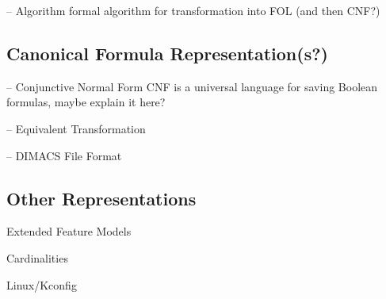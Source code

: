 \begin{frame}{-- Algorithm}
	formal algorithm for transformation into FOL (and then CNF?)
\end{frame}

\subsection{Canonical Formula Representation(s?)}

\begin{frame}{-- Conjunctive Normal Form}
	CNF is a universal language for saving Boolean formulas, maybe explain it here?
\end{frame}

\begin{frame}{-- Equivalent Transformation}
	
\end{frame}

\begin{frame}{-- DIMACS File Format}
	
\end{frame}


\subsection{Other Representations} %

\begin{frame}{\insertsubsection}
	Extended Feature Models
	

	Cardinalities

	Linux/Kconfig %
\end{frame}








